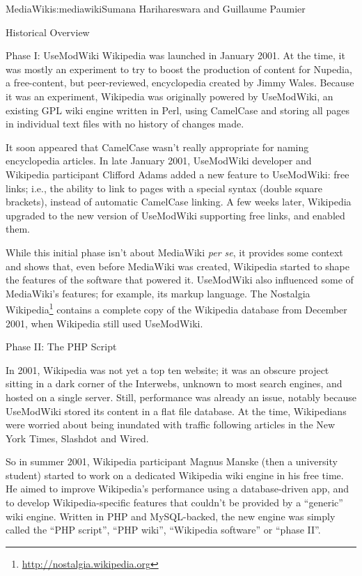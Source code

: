 \begin{aosachapter}{MediaWiki}{s:mediawiki}{Sumana Harihareswara and Guillaume Paumier}
\begin{aosasect1}{Historical Overview}
\begin{aosasect2}{Phase I: UseModWiki}
Wikipedia was launched in January 2001. At the time, it was mostly an
experiment to try to boost the production of content for Nupedia, a
free-content, but peer-reviewed, encyclopedia created by Jimmy
Wales. Because it was an experiment, Wikipedia was originally powered
by UseModWiki, an existing GPL wiki engine written in Perl, using
CamelCase and storing all pages in individual text files with no
history of changes made.

It soon appeared that CamelCase wasn't really appropriate for naming
encyclopedia articles. In late January 2001, UseModWiki developer and
Wikipedia participant Clifford Adams added a new feature to
UseModWiki: free links; i.e., the ability to link to pages with a
special syntax (double square brackets), instead of automatic
CamelCase linking. A few weeks later, Wikipedia upgraded to the new
version of UseModWiki supporting free links, and enabled them.

While this initial phase isn't about MediaWiki \emph{per se}, it
provides some context and shows that, even before MediaWiki was
created, Wikipedia started to shape the features of the software that
powered it. UseModWiki also influenced some of MediaWiki's features;
for example, its markup language. The Nostalgia
Wikipedia\footnote{\url{http://nostalgia.wikipedia.org}} contains a
complete copy of the Wikipedia database from December 2001, when
Wikipedia still used UseModWiki.

\end{aosasect2}

\begin{aosasect2}{Phase II: The PHP Script}

In 2001, Wikipedia was not yet a top ten website; it was an obscure
project sitting in a dark corner of the Interwebs, unknown to most
search engines, and hosted on a single server. Still, performance was
already an issue, notably because UseModWiki stored its content in a
flat file database. At the time, Wikipedians were worried about being
inundated with traffic following articles in the New York Times,
Slashdot and Wired.

So in summer 2001, Wikipedia participant Magnus Manske (then a
university student) started to work on a dedicated Wikipedia wiki
engine in his free time. He aimed to improve Wikipedia's performance
using a database-driven app, and to develop
Wikipedia-specific features that couldn't be provided by a ``generic''
wiki engine. Written in PHP and MySQL-backed, the new engine was
simply called the ``PHP script'', ``PHP wiki'', ``Wikipedia software'' or
``phase II''.


\end{aosasect2}
\end{aosasect1}
\end{aosachapter}
